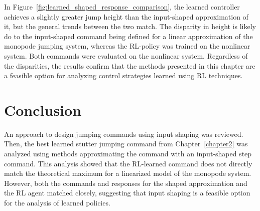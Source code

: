 In Figure~\ref{fig:learned_shaped_response_comparison}, the learned controller achieves a slightly greater jump height than the input-shaped approximation of it, but the general trends between the two match. The disparity in height is likely do to the input-shaped command being defined for a linear approximation of the monopode jumping system, whereas the RL-policy was trained on the nonlinear system. Both commands were evaluated on the nonlinear system. Regardless of the disparities, the results confirm that the methods presented in this chapter are a feasible option for analyzing control strategies learned using RL techniques.

\section{Conclusion}
%
An approach to design jumping commands using input shaping was reviewed. Then, the best learned stutter jumping command from Chapter~\ref{chapter2} was analyzed using methods approximating the command with an input-shaped step command. This analysis showed that the RL-learned command does not directly match the theoretical maximum for a linearized model of the monopode system. However, both the commands and responses for the shaped approximation and the RL agent matched closely, suggesting that input shaping is a feasible option for the analysis of learned policies.